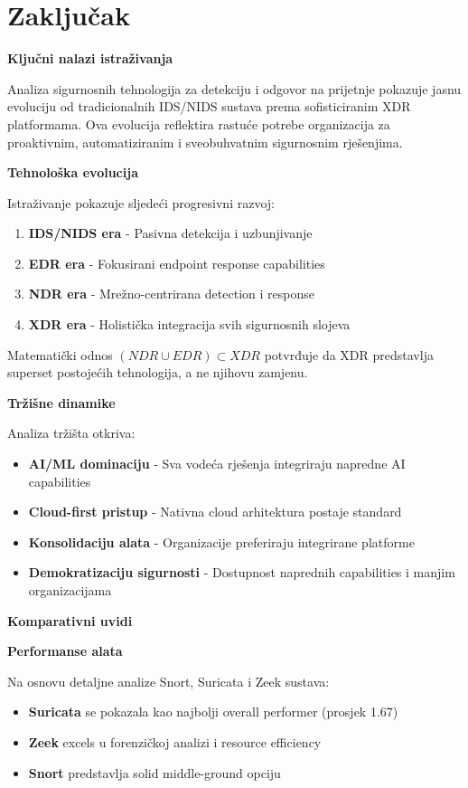 \chapter{Zaključak}

\textbf{Ključni nalazi istraživanja}

Analiza sigurnosnih tehnologija za detekciju i odgovor na prijetnje pokazuje jasnu evoluciju od tradicionalnih IDS/NIDS sustava prema sofisticiranim XDR platformama. Ova evolucija reflektira rastuće potrebe organizacija za proaktivnim, automatiziranim i sveobuhvatnim sigurnosnim rješenjima.

\textbf{Tehnološka evolucija}

Istraživanje pokazuje sljedeći progresivni razvoj:

\begin{enumerate}
\item \textbf{IDS/NIDS era} - Pasivna detekcija i uzbunjivanje
\item \textbf{EDR era} - Fokusirani endpoint response capabilities
\item \textbf{NDR era} - Mrežno-centrirana detection i response
\item \textbf{XDR era} - Holistička integracija svih sigurnosnih slojeva
\end{enumerate}

Matematički odnos $(NDR \cup EDR) \subset XDR$ potvrđuje da XDR predstavlja superset postojećih tehnologija, a ne njihovu zamjenu.

\textbf{Tržišne dinamike}

Analiza tržišta otkriva:
\begin{itemize}
\item \textbf{AI/ML dominaciju} - Sva vodeća rješenja integriraju napredne AI capabilities
\item \textbf{Cloud-first pristup} - Nativna cloud arhitektura postaje standard
\item \textbf{Konsolidaciju alata} - Organizacije preferiraju integrirane platforme
\item \textbf{Demokratizaciju sigurnosti} - Dostupnost naprednih capabilities i manjim organizacijama
\end{itemize}

\textbf{Komparativni uvidi}

\textbf{Performanse alata}

Na osnovu detaljne analize Snort, Suricata i Zeek sustava:
\begin{itemize}
\item \textbf{Suricata} se pokazala kao najbolji overall performer (prosjek 1.67)
\item \textbf{Zeek} excels u forenzičkoj analizi i resource efficiency
\item \textbf{Snort} predstavlja solid middle-ground opciju
\end{itemize}

